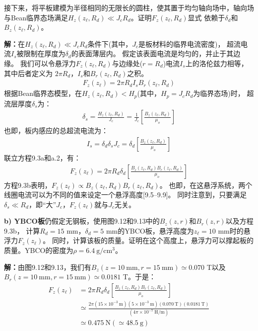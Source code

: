 接下来，将平板建模为半径相同的无限长的圆柱，使其置于均匀轴向场中，轴向场
与Bean临界态场满足$H_z(z_\ell,R_d)\ll J_c R_d$。证明$F_z(z_\ell,R_d)$显式
依赖于$\delta_d$和$B_z(z_\ell,R_d)$。

\textbf{解：}在$H_z(z_\ell,R_d)\ll J_c R_d$条件下(其中，$J_c$是板材料的临界电流密度)，
超流电流$I_s$被限制在厚度为$\delta_d$的表面薄层内。
假定该表面电流是均匀的，并止于其边缘。
我们可以令悬浮力$F_z(z_\ell,R_d)$与边缘处($r=R_d$)电流$I_s$上的洛伦兹力相等，其中后者定义为
$2\pi R_d，I_s$和$B_r(z_\ell,R_d)$之积。
\begin{align*}%
F_{z}(z_{\ell})=2\pi R_{d}I_{s}B_{r}(z_{\ell},R_{d})\tag{9.3a}
\end{align*}
根据Bean临界态模型，在$H_z(z_\ell,R_d)<H_p$(其中，$H_p=J_c R_d$为临界态场)时，
超流层厚度$\delta_{s}$为：
\begin{align*}%
\delta_{s}=\frac{H_{z}(z_{\ell},R_{d})}{J_{c}}=\frac{1}{J_{c}}[\frac{B_{z}(z_{\ell},R_{d})}{\mu_{o}}]\tag{a.1}
\end{align*}
也即，板内感应的总超流电流为：
\begin{align*}%
I_{s}=\delta_{d}\delta_{s}J_{c}=\delta_{d}[\frac{B_{z}(z_{\ell},R_{d})}{\mu_{o}}]\tag{a.2}
\end{align*}
联立方程9.3a和a.2，有：
\begin{align*}%
F_{z}(z_{\ell})=2\pi R_{d}\delta_{d}[\frac{B_{z}(z_{\ell},R_{d})B_{r}(z_{\ell},R_{d})}{\mu_{o}}]\tag{9.3b}
\end{align*}
方程9.3b表明，$F_z(z_\ell)\propto B_z(z_\ell,R_d)B_r(z_\ell,R_d)$。
也即，在这悬浮系统，两个线圈电流可以为不同的值来设定一个悬浮高度[9.5--9.9]。
同时注意到，只要满足$\delta_{s}\ll R_d$，即“大”$J_c$，$F_z(z_\ell)$就与$J_c$无关。

\textbf{b) YBCO板}\qquad 仍假定无钢板，使用图9.12和9.13中的$B_z(z,r)$和$B_r(z,r)$以及方程9.3b，
计算$R_d=15$ mm，$\delta_d=5$ mm的YBCO板，悬浮高度为$z_\ell=10$ mm时的悬浮力$F_z(z_\ell)$。
同时，计算该板的质量。证明在这个高度上，悬浮力可以撑起板的质量。YBCO的密度为$\rho=6.4\ \mathrm{g/cm^3}$。

\textbf{解：}由图9.12和9.13，我们有$B_z(z=10\ \mathrm{mm},r=15\ \mathrm{mm})\simeq 0.070$ T以及
$B_r(z=10\ \mathrm{mm},r=15\ \mathrm{mm})\simeq 0.0181$ T。于是：
\begin{align*}%
F_{z}(z_{\ell})&=2\pi R_{d}\delta_{d}[\frac{B_{z}(z_{\ell},R_{d})B_{r}(z_{\ell},R_{d})}{\mu_{o}}]\\ \tag{9.3b}
&\simeq\frac{2\pi(15\times 10^{-3}\ \mathrm{m})(5\times 10^{-3}\ \mathrm{m})(0.070\ \mathrm{T})(0.0181\ \mathrm{T})}{(4\pi\times 10^{-7}\ \mathrm{H/m})}\\
&\simeq 0.475\ \mathrm{N}(\simeq 48.5\ \mathrm{g})
\end{align*}

